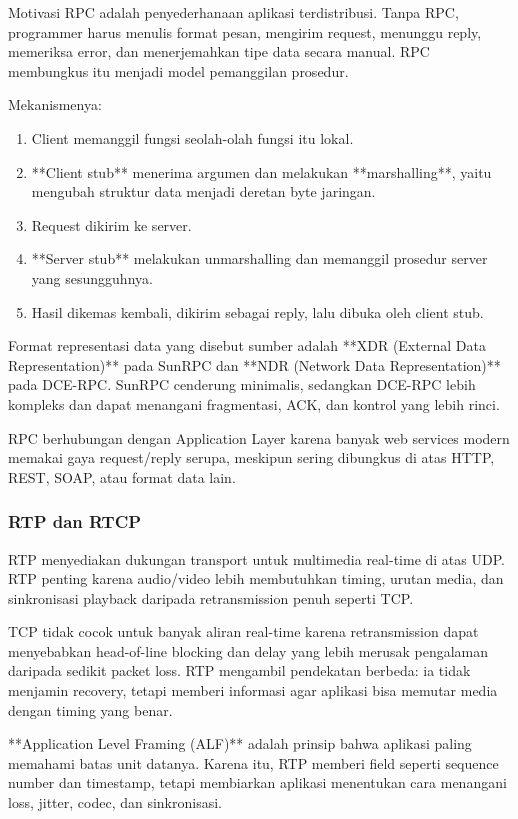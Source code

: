 Motivasi RPC adalah penyederhanaan aplikasi terdistribusi. Tanpa RPC, programmer harus menulis format pesan, mengirim request, menunggu reply, memeriksa error, dan menerjemahkan tipe data secara manual. RPC membungkus itu menjadi model pemanggilan prosedur.

Mekanismenya:
\begin{enumerate}
    \item Client memanggil fungsi seolah-olah fungsi itu lokal.
    \item **Client stub** menerima argumen dan melakukan **marshalling**, yaitu mengubah struktur data menjadi deretan byte jaringan.
    \item Request dikirim ke server.
    \item **Server stub** melakukan unmarshalling dan memanggil prosedur server yang sesungguhnya.
    \item Hasil dikemas kembali, dikirim sebagai reply, lalu dibuka oleh client stub.
\end{enumerate}

Format representasi data yang disebut sumber adalah **XDR (External Data Representation)** pada SunRPC dan **NDR (Network Data Representation)** pada DCE-RPC. SunRPC cenderung minimalis, sedangkan DCE-RPC lebih kompleks dan dapat menangani fragmentasi, ACK, dan kontrol yang lebih rinci.

RPC berhubungan dengan Application Layer karena banyak web services modern memakai gaya request/reply serupa, meskipun sering dibungkus di atas HTTP, REST, SOAP, atau format data lain.

\subsubsection{RTP dan RTCP}
\begin{jawab}
RTP menyediakan dukungan transport untuk multimedia real-time di atas UDP. RTP penting karena audio/video lebih membutuhkan timing, urutan media, dan sinkronisasi playback daripada retransmission penuh seperti TCP.
\end{jawab}

TCP tidak cocok untuk banyak aliran real-time karena retransmission dapat menyebabkan head-of-line blocking dan delay yang lebih merusak pengalaman daripada sedikit packet loss. RTP mengambil pendekatan berbeda: ia tidak menjamin recovery, tetapi memberi informasi agar aplikasi bisa memutar media dengan timing yang benar.

**Application Level Framing (ALF)** adalah prinsip bahwa aplikasi paling memahami batas unit datanya. Karena itu, RTP memberi field seperti sequence number dan timestamp, tetapi membiarkan aplikasi menentukan cara menangani loss, jitter, codec, dan sinkronisasi.

